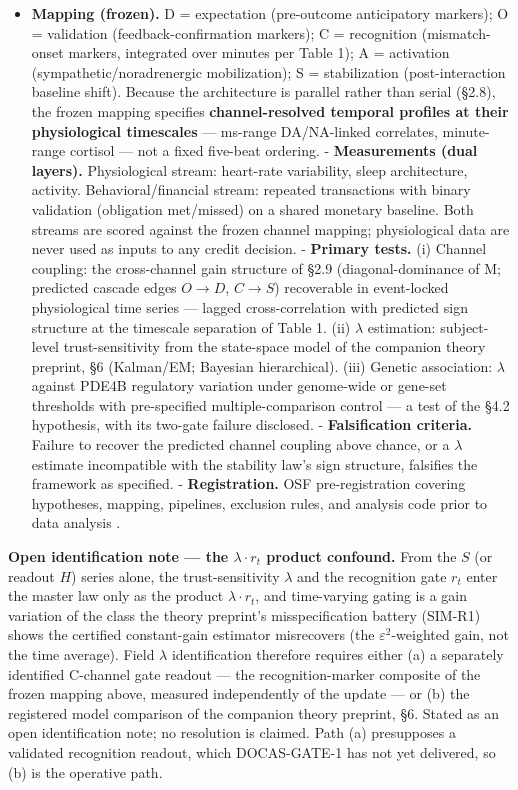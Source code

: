 \documentclass[
]{article}
\providecommand{\tightlist}{%
  \setlength{\itemsep}{0pt}\setlength{\parskip}{0pt}}
\begin{document}
\begin{itemize}
\tightlist
\item
  \textbf{Mapping (frozen).} D = expectation (pre-outcome anticipatory
  markers); O = validation (feedback-confirmation markers); C =
  recognition (mismatch-onset markers, integrated over minutes per Table
  1); A = activation (sympathetic/noradrenergic mobilization); S =
  stabilization (post-interaction baseline shift). Because the
  architecture is parallel rather than serial (§2.8), the frozen mapping
  specifies \textbf{channel-resolved temporal profiles at their
  physiological timescales} --- ms-range DA/NA-linked correlates,
  minute-range cortisol --- not a fixed five-beat ordering. -
  \textbf{Measurements (dual layers).} Physiological stream: heart-rate
  variability, sleep architecture, activity. Behavioral/financial
  stream: repeated transactions with binary validation (obligation
  met/missed) on a shared monetary baseline. Both streams are scored
  against the frozen channel mapping; physiological data are never used
  as inputs to any credit decision. - \textbf{Primary tests.} (i)
  Channel coupling: the cross-channel gain structure of §2.9
  (diagonal-dominance of M; predicted cascade edges \(O{\to}D\),
  \(C{\to}S\)) recoverable in event-locked physiological time series ---
  lagged cross-correlation with predicted sign structure at the
  timescale separation of Table 1. (ii) \(\lambda\) estimation:
  subject-level trust-sensitivity from the state-space model of the
  companion theory preprint, §6 (Kalman/EM; Bayesian hierarchical).
  (iii) Genetic association: \(\lambda\) against PDE4B regulatory
  variation under genome-wide or gene-set thresholds with pre-specified
  multiple-comparison control --- a test of the §4.2 hypothesis, with
  its two-gate failure disclosed. - \textbf{Falsification criteria.}
  Failure to recover the predicted channel coupling above chance, or a
  \(\lambda\) estimate incompatible with the stability law's sign
  structure, falsifies the framework as specified. -
  \textbf{Registration.} OSF pre-registration covering hypotheses,
  mapping, pipelines, exclusion rules, and analysis code prior to data
  analysis .
\end{itemize}

\textbf{Open identification note --- the \(\lambda \cdot r_t\) product
confound.} From the \(S\) (or readout \(H\)) series alone, the
trust-sensitivity \(\lambda\) and the recognition gate \(r_t\) enter the
master law only as the product \(\lambda \cdot r_t\), and time-varying
gating is a gain variation of the class the theory preprint's
misspecification battery (SIM-R1) shows the certified constant-gain
estimator misrecovers (the \(\varepsilon^{2}\)-weighted gain, not the
time average). Field \(\lambda\) identification therefore requires
either (a) a separately identified C-channel gate readout --- the
recognition-marker composite of the frozen mapping above, measured
independently of the update --- or (b) the registered model comparison
of the companion theory preprint, §6. Stated as an open identification
note; no resolution is claimed. Path (a) presupposes a validated
recognition readout, which DOCAS-GATE-1 has not yet delivered, so (b) is
the operative path.
\end{document}
